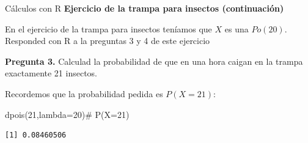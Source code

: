 \documentclass[
  ignorenonframetext,
  aspectratio=169]{beamer}
\newenvironment{Shaded}{\begin{snugshade}}{\end{snugshade}}
\newcommand{\AttributeTok}[1]{\textcolor[rgb]{0.40,0.45,0.13}{#1}}
\newcommand{\CommentTok}[1]{\textcolor[rgb]{0.37,0.37,0.37}{#1}}
\newcommand{\DecValTok}[1]{\textcolor[rgb]{0.68,0.00,0.00}{#1}}
\newcommand{\FunctionTok}[1]{\textcolor[rgb]{0.28,0.35,0.67}{#1}}
\newcommand{\NormalTok}[1]{\textcolor[rgb]{0.00,0.23,0.31}{#1}}
\begin{document}
\begin{frame}[fragile]{Cálculos con R}
\protect\hypertarget{cuxe1lculos-con-r-7}{}
\textbf{Ejercicio de la trampa para insectos (continuación)}

En el ejercicio de la trampa para insectos teníamos que \(X\) es una
\(Po(20)\). Responded con R a la preguntas 3 y 4 de este ejercicio

\textbf{Pregunta 3.} Calculad la probabilidad de que en una hora caigan
en la trampa exactamente 21 insectos.

Recordemos que la probabilidad pedida es \(P(X=21)\):

\begin{Shaded}
\begin{Highlighting}[]
\FunctionTok{dpois}\NormalTok{(}\DecValTok{21}\NormalTok{,}\AttributeTok{lambda=}\DecValTok{20}\NormalTok{)}\CommentTok{\# P(X=21)}
\end{Highlighting}
\end{Shaded}

\begin{verbatim}
[1] 0.08460506
\end{verbatim}
\end{frame}
\end{document}
